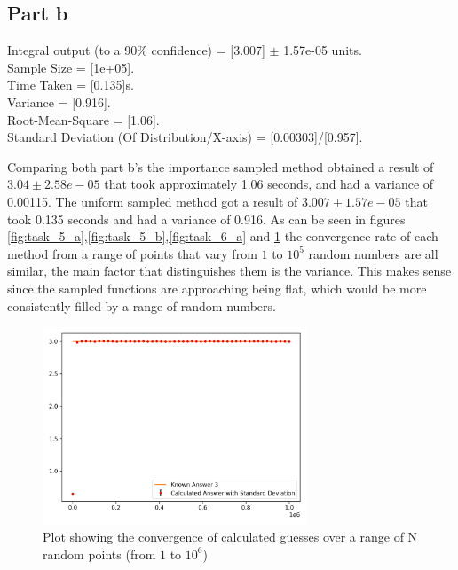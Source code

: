 \documentclass[12pt, A4]{article}
\begin{document}
\subsection{Part b} %
\label{sub:6Part b} 

Integral output (to a 90\% confidence) = [3.007] $\pm$  1.57e-05 units.
\\
Sample Size = [1e+05].
\\
Time Taken = [0.135]s.
\\
Variance = [0.916].
\\
Root-Mean-Square = [1.06].
\\
Standard Deviation (Of Distribution/X-axis) = [0.00303]/[0.957]. 

\vspace{1em}

Comparing both part b's the importance sampled method obtained a result of $3.04 \pm 2.58e-05$ that took 
approximately 1.06 seconds, and had a variance of 0.00115. The uniform sampled method got a result 
of $3.007 \pm 1.57e-05$ that took 0.135 seconds and had a variance of 0.916. As can be seen in figures 
\ref{fig:task_5_a},\ref{fig:task_5_b},\ref{fig:task_6_a} and \ref{fig:task_6_b} the convergence rate of 
each method from a range of points that vary from $1$ to $10^5$ random numbers are all similar, the main 
factor that distinguishes them is the variance. This makes sense since the sampled functions are approaching 
being flat, which would be more consistently filled by a range of random numbers.

\begin{figure}[H]
  \begin{center}
    \includegraphics[width=0.7\textwidth]{task_6_b.png}
  \end{center}
  \caption{Plot showing the convergence of calculated guesses over a range of N random points (from $1$ to $10^6$)}
  \label{fig:task_6_b}
\end{figure}
\end{document}
